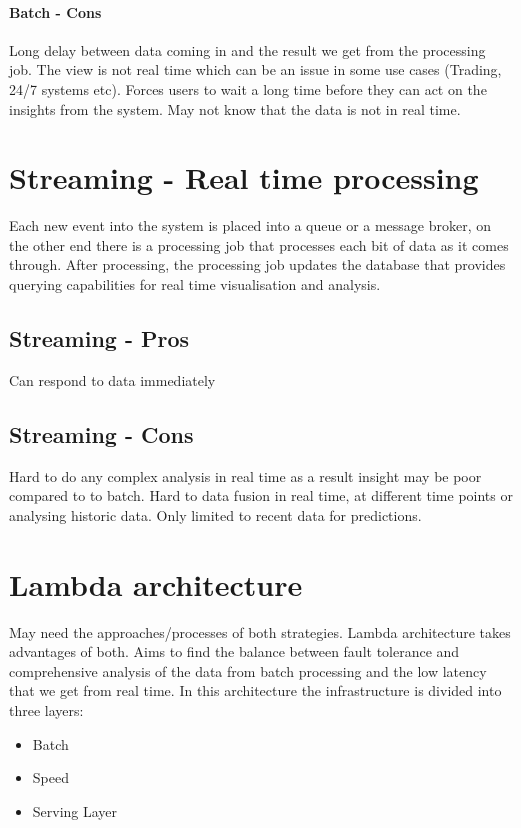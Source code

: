 \paragraph{Batch - Cons}
Long delay between data coming in and the result we get from the processing job.
The view is not real time which can be an issue in some use cases (Trading, 24/7 systems etc).
Forces users to wait a long time before they can act on the insights from the system.
May not know that the data is not in real time.


\section{Streaming - Real time processing}
Each new event into the system is placed into a queue or a message broker, on the other end there is a processing job that processes each bit of data as it comes through.
After processing, the processing job updates the database that provides querying capabilities for real time visualisation and analysis.

\subsection{Streaming - Pros}
Can respond to data immediately

\subsection{Streaming - Cons}
Hard to do any complex analysis in real time as a result insight may be poor compared to to batch.
Hard to data fusion in real time, at different time points or analysing historic data.
Only limited to recent data for predictions.


\section{Lambda architecture}
May need the approaches/processes of both strategies.
Lambda architecture takes advantages of both.
Aims to find the balance between fault tolerance and comprehensive analysis of the data from batch processing and the low latency that we get from real time.
In this architecture the infrastructure is divided into three layers:
\begin{itemize}
    \item Batch
    \item Speed
    \item Serving Layer
\end{itemize}

